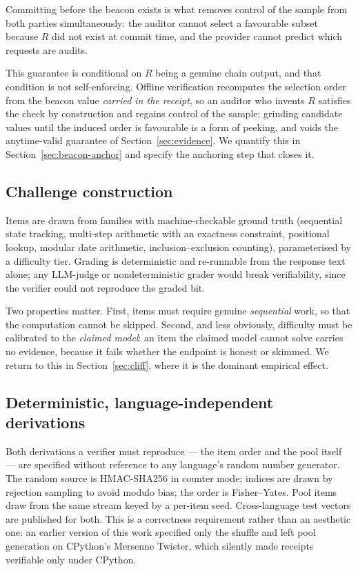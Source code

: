 \documentclass[11pt]{article}
\theoremstyle{definition}
\begin{document}
\noindent Committing before the beacon exists is what removes control of the
sample from both parties simultaneously: the auditor cannot select a favourable
subset because $R$ did not exist at commit time, and the provider cannot predict
which requests are audits.

\noindent This guarantee is conditional on $R$ being a genuine chain output, and
that condition is not self-enforcing. Offline verification recomputes the
selection order from the beacon value \emph{carried in the receipt}, so an
auditor who invents $R$ satisfies the check by construction and regains control
of the sample; grinding candidate values until the induced order is favourable
is a form of peeking, and voids the anytime-valid guarantee of
Section~\ref{sec:evidence}. We quantify this in Section~\ref{sec:beacon-anchor}
and specify the anchoring step that closes it.

\subsection{Challenge construction}

Items are drawn from families with machine-checkable ground truth (sequential
state tracking, multi-step arithmetic with an exactness constraint, positional
lookup, modular date arithmetic, inclusion--exclusion counting), parameterised by
a difficulty tier. Grading is deterministic and re-runnable from the response
text alone; any LLM-judge or nondeterministic grader would break verifiability,
since the verifier could not reproduce the graded bit.

Two properties matter. First, items must require genuine \emph{sequential} work,
so that the computation cannot be skipped. Second, and less obviously, difficulty
must be calibrated to the \emph{claimed model}: an item the claimed model cannot
solve carries no evidence, because it fails whether the endpoint is honest or
skimmed. We return to this in Section~\ref{sec:cliff}, where it is the dominant
empirical effect.

\subsection{Deterministic, language-independent derivations}

Both derivations a verifier must reproduce --- the item order and the pool itself
--- are specified without reference to any language's random number generator.
The random source is HMAC-SHA256 in counter mode; indices are drawn by rejection
sampling to avoid modulo bias; the order is Fisher--Yates. Pool items draw from
the same stream keyed by a per-item seed. Cross-language test vectors are
published for both. This is a correctness requirement rather than an aesthetic
one: an earlier version of this work specified only the shuffle and left pool
generation on CPython's Mersenne Twister, which silently made receipts
verifiable only under CPython.
\end{document}
